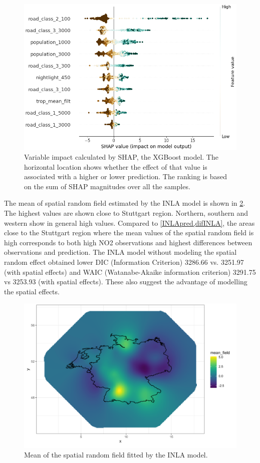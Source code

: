 \documentclass{article}
\begin{document}
\begin{figure}
\centering
\includegraphics[scale = 0.5]{fig/xgbshap.png}
\caption{Variable impact calculated by SHAP, the XGBoost model. The horizontal location shows whether the effect of that value is associated with a higher or lower prediction. The ranking is based on the sum of SHAP magnitudes over all the samples.}
\label{xgbshap}
\end{figure}

The mean of spatial random field estimated by the INLA model is shown in \cref{randomfield}. The highest values are shown close to Stuttgart region. Northern, southern and western show in general high values. Compared to \cref{INLApred,difINLA}, the areas close to the Stuttgart region where the mean values of the spatial random field is high corresponds to both high NO2 observations and highest differences between observations and prediction.  
The INLA model without modeling the spatial random effect obtained lower DIC (Information Criterion) 3286.66 vs. 3251.97 (with spatial effects) and WAIC (Watanabe-Akaike information criterion) 3291.75 vs 3253.93 (with spatial effects). These also suggest the advantage of modelling the spatial effects.

\begin{figure}
\centering
\includegraphics[scale = 0.5]{fig/mean_randomfield.png}
\caption{Mean of the spatial random field fitted by the INLA model.}
\label{randomfield}
\end{figure}
\end{document}
